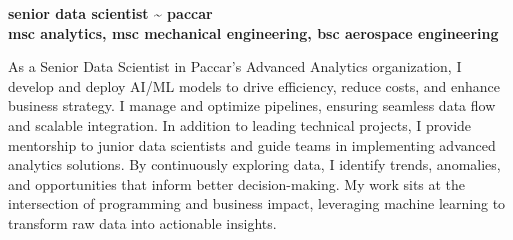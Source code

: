 \documentclass[12pt,a4paper]{moderncv}
\begin{document}
\vspace*{-4\baselineskip}
\makecvtitle
\vspace{-1.5\baselineskip}

\begin{flushright}
\textbf{\large senior data scientist \textasciitilde{} paccar} \\
\textbf{\large msc analytics, msc mechanical engineering, bsc aerospace engineering} \\
\end{flushright}


As a Senior Data Scientist in Paccar’s Advanced Analytics organization, I develop and deploy AI/ML models to drive efficiency, reduce costs, and enhance business strategy. I manage and optimize pipelines, ensuring seamless data flow and scalable integration. In addition to leading technical projects, I provide mentorship to junior data scientists and guide teams in implementing advanced analytics solutions. By continuously exploring data, I identify trends, anomalies, and opportunities that inform better decision-making. My work sits at the intersection of programming and business impact, leveraging machine learning to transform raw data into actionable insights.
\\
\end{document}
